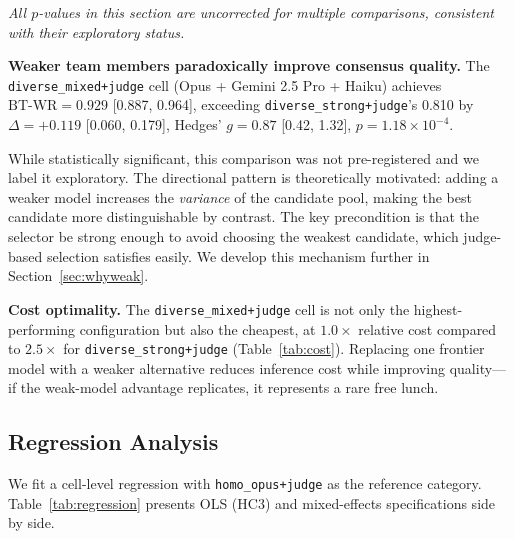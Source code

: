 \documentclass[10pt,twocolumn]{article}
\theoremstyle{remark}
\begin{document}
\noindent\textit{All $p$-values in this section are uncorrected for multiple comparisons, consistent with their exploratory status.}

\textbf{Weaker team members paradoxically improve consensus quality.} The \texttt{diverse\_mixed+judge} cell (Opus + Gemini 2.5 Pro + Haiku) achieves $\mathrm{BT\text{-}WR} = 0.929$ [0.887, 0.964], exceeding \texttt{diverse\_strong+judge}'s 0.810 by $\Delta = +0.119$ [0.060, 0.179], Hedges' $g = 0.87$ [0.42, 1.32], $p = 1.18 \times 10^{-4}$.

While statistically significant, this comparison was not pre-registered and we label it exploratory. The directional pattern is theoretically motivated: adding a weaker model increases the \emph{variance} of the candidate pool, making the best candidate more distinguishable by contrast. The key precondition is that the selector be strong enough to avoid choosing the weakest candidate, which judge-based selection satisfies easily. We develop this mechanism further in Section~\ref{sec:whyweak}.

\textbf{Cost optimality.} The \texttt{diverse\_mixed+judge} cell is not only the highest-performing configuration but also the cheapest, at $1.0\times$ relative cost compared to $2.5\times$ for \texttt{diverse\_strong+judge} (Table~\ref{tab:cost}). Replacing one frontier model with a weaker alternative reduces inference cost while improving quality---if the weak-model advantage replicates, it represents a rare free lunch.

\subsection{Regression Analysis}
\label{sec:regression}

We fit a cell-level regression with \texttt{homo\_opus+judge} as the reference category. Table~\ref{tab:regression} presents OLS (HC3) and mixed-effects specifications side by side.
\end{document}
